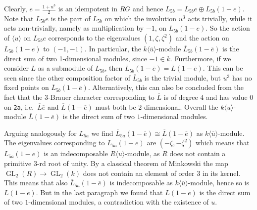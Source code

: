 \documentclass[10pt,a4paper,reqno]{amsart}
\theoremstyle{definition}
\theoremstyle{remark}
\begin{document}
Clearly, $e = \frac{1+u^3}{2}$ is an idempotent in $RG$ and hence $L_{5b} = L_{5b}e \oplus L_{5b}(1-e)$. Note that $L_{5b}e$ is the part of $L_{5b}$ on which the involution $u^3$ acts trivially, while it acts non-trivially, namely as multiplication by $-1$, on $L_{5b}(1-e)$. So the action of $\langle u \rangle$ on $L_{5b}e$ corresponds to the eigenvalues $(1, \zeta, \zeta^2)$ and the action on $L_{5b}(1-e)$ to $(-1,-1)$. In particular, the $k\langle \overline{u} \rangle$-module $\overline{L}_{5b}(1-\overline{e})$ is the direct sum of two 1-dimensional modules, since $-1 \in k$. Furthermore, if we consider $\overline{L}$ as a submodule of $\overline{L}_{5b}$, then $\overline{L}_{5b}(1-\overline{e}) = \overline{L}(1-\overline{e})$. This can be seen since the other composition factor of $\overline{L}_{5b}$ is the trivial module, but $u^3$ has no fixed points on $\overline{L}_{5b}(1-\overline{e})$. Alternatively, this can also be concluded from the fact that the $3$-Brauer character corresponding to $\overline{L}$ is of degree $4$ and has value $0$ on \texttt{2a}, i.e.\ $\overline{L}\overline{e}$ and $\overline{L}(1-\overline{e})$ must both be $2$-dimensional. Overall the $k\langle u \rangle$-module $\overline{L}(1-\overline{e})$ is the direct sum of two $1$-dimensional modules.

Arguing analogously for $L_{5a}$ we find $\overline{L}_{5a}(1-\overline{e}) \cong \overline{L}(1-\overline{e})$ as $k\langle \overline{u} \rangle$-module. The eigenvalues corresponding to $L_{5a}(1-e)$ are $(-\zeta, -\zeta^2)$ which means that $L_{5a}(1-e)$ is an indecomposable $R\langle u \rangle$-module, as $R$ does not contain a primitive $3$-rd root of unity. By a classical theorem of Minkowski the map $\operatorname{GL}_2(R) \rightarrow \operatorname{GL}_2(k)$ does not contain an element of order $3$ in its kernel. This means that also $\overline{L}_{5a}(1-\overline{e})$ is indecomposable as $k\langle \overline{u} \rangle$-module, hence so is $\overline{L}(1-\overline{e})$. But in the last paragraph we found that $\overline{L}(1-\overline{e})$ is the direct sum of two $1$-dimensional modules, a contradiction with the existence of $u$. 
\end{document}
